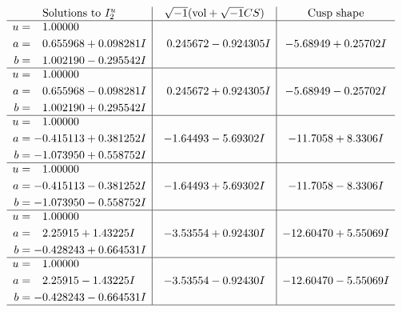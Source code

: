 \documentclass[1p]{elsarticle_modified}
\theoremstyle{definition}
\newcommand{\I}{\sqrt{-1}}
\begin{document}
$$\begin{array}{c|c|c}  
\text{Solutions to }I^u_{2}& \I (\text{vol} + \sqrt{-1}CS) & \text{Cusp shape}\\
 \hline 
\begin{aligned}
u &= \phantom{-}1.00000\phantom{ +0.000000I} \\
a &= \phantom{-}0.655968 + 0.098281 I \\
b &= \phantom{-}1.002190 - 0.295542 I\end{aligned}
 & \phantom{-}0.245672 - 0.924305 I & -5.68949 + 0.25702 I \\ \hline\begin{aligned}
u &= \phantom{-}1.00000\phantom{ +0.000000I} \\
a &= \phantom{-}0.655968 - 0.098281 I \\
b &= \phantom{-}1.002190 + 0.295542 I\end{aligned}
 & \phantom{-}0.245672 + 0.924305 I & -5.68949 - 0.25702 I \\ \hline\begin{aligned}
u &= \phantom{-}1.00000\phantom{ +0.000000I} \\
a &= -0.415113 + 0.381252 I \\
b &= -1.073950 + 0.558752 I\end{aligned}
 & -1.64493 - 5.69302 I & -11.7058 + 8.3306 I \\ \hline\begin{aligned}
u &= \phantom{-}1.00000\phantom{ +0.000000I} \\
a &= -0.415113 - 0.381252 I \\
b &= -1.073950 - 0.558752 I\end{aligned}
 & -1.64493 + 5.69302 I & -11.7058 - 8.3306 I \\ \hline\begin{aligned}
u &= \phantom{-}1.00000\phantom{ +0.000000I} \\
a &= \phantom{-}2.25915 + 1.43225 I \\
b &= -0.428243 + 0.664531 I\end{aligned}
 & -3.53554 + 0.92430 I & -12.60470 + 5.55069 I \\ \hline\begin{aligned}
u &= \phantom{-}1.00000\phantom{ +0.000000I} \\
a &= \phantom{-}2.25915 - 1.43225 I \\
b &= -0.428243 - 0.664531 I\end{aligned}
 & -3.53554 - 0.92430 I & -12.60470 - 5.55069 I\\
 \hline 
 \end{array}$$\newpage\newpage\renewcommand{\arraystretch}{1}
\end{document}
